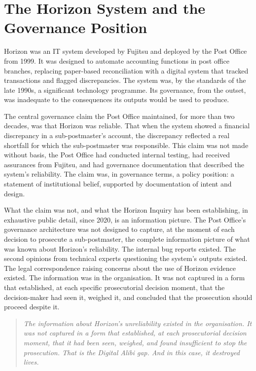\scenebreak

\section{The Horizon System and the Governance Position}

Horizon was an IT system developed by Fujitsu and deployed by the Post Office from 1999. It was designed to automate accounting functions in post office branches, replacing paper-based reconciliation with a digital system that tracked transactions and flagged discrepancies. The system was, by the standards of the late 1990s, a significant technology programme. Its governance, from the outset, was inadequate to the consequences its outputs would be used to produce.

The central governance claim the Post Office maintained, for more than two decades, was that Horizon was reliable. That when the system showed a financial discrepancy in a sub-postmaster's account, the discrepancy reflected a real shortfall for which the sub-postmaster was responsible. This claim was not made without basis, the Post Office had conducted internal testing, had received assurances from Fujitsu, and had governance documentation that described the system's reliability. The claim was, in governance terms, a policy position: a statement of institutional belief, supported by documentation of intent and design.

What the claim was not, and what the Horizon Inquiry has been establishing, in exhaustive public detail, since 2020, is an information picture. The Post Office's governance architecture was not designed to capture, at the moment of each decision to prosecute a sub-postmaster, the complete information picture of what was known about Horizon's reliability. The internal bug reports existed. The second opinions from technical experts questioning the system's outputs existed. The legal correspondence raising concerns about the use of Horizon evidence existed. The information was in the organisation. It was not captured in a form that established, at each specific prosecutorial decision moment, that the decision-maker had seen it, weighed it, and concluded that the prosecution should proceed despite it.

\begin{quote}
\emph{The information about Horizon's unreliability existed in the organisation. It was not captured in a form that established, at each prosecutorial decision moment, that it had been seen, weighed, and found insufficient to stop the prosecution. That is the Digital Alibi gap. And in this case, it destroyed lives.}
\end{quote}

